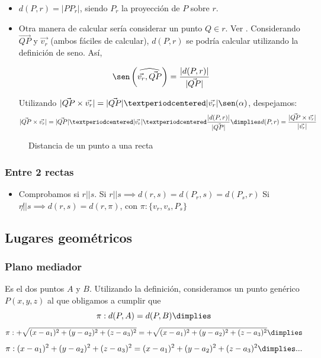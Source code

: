 \begin{itemize}
  \item $d(P,r) = |PP_{r}|$, siendo $P_r$ la proyección de $P$ sobre $r$.
  \item Otra manera de calcular sería considerar un punto $Q\in r$. Ver .
  \subitem Considerando $\vec{QP}$ y $\vec{v_r}$ (ambos fáciles de calcular), $d(P,r)$ se podría calcular utilizando la definición de seno. Así,
  
  \[\sen\left(\widehat{\vec{v_r},\vec{QP}}\right) = \displaystyle\frac{|d(P,r)|}{|\vec{QP}|}\]

  \subitem Utilizando $|\vec{QP}\times\vec{v_r}| = |\vec{QP}|·|\vec{v_r}|\sen(\alpha)$, despejamos:
  \[
    |\vec{QP}\times\vec{v_r}| = |\vec{QP}|·|\vec{v_r}|·\frac{|d(P,r)|}{|\vec{QP}|} \dimplies d(P,r) = \frac{|\vec{QP}\times\vec{v_r}|}{|\vec{v_r}|}
  \]
\end{itemize}

\begin{figure}[hbtp]
\centering
{}

\label{fig::dist-punto-recta}
\caption{Distancia de un punto a una recta}
\end{figure}



\subsubsection{Entre 2 rectas}
\begin{itemize}
  \item Comprobamos si $r||s$. 
  \subitem Si $r||s \implies d(r,s) = d(P_r,s) = d(P_s,r)$
  \subitem Si $r\not|| s \implies d(r,s) = d(r,\pi)$, con $\pi:\{v_r,v_s,P_s\}$
\end{itemize}


\subsection{Lugares geométricos}


\subsubsection{Plano mediador}

Es el \lgdlp dos puntos $A$ y $B$. Utilizando la definición, consideramos un punto genérico $P(x,y,z)$ al que obligamos a cumplir que 
\[\pi: d(P,A) = d(P,B) \dimplies\]
\[\pi: +\sqrt{(x-a_1)^2+(y-a_2)^2+(z-a_3)^2} = +\sqrt{(x-a_1)^2+(y-a_2)^2+(z-a_3)^2} \dimplies\]
\[\pi: (x-a_1)^2+(y-a_2)^2+(z-a_3)^2 = (x-a_1)^2+(y-a_2)^2+(z-a_3)^2\dimplies ...\]

